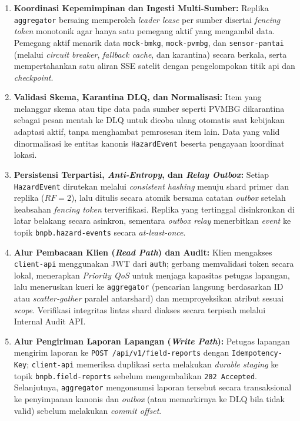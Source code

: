 \begin{enumerate}
    \item \textbf{Koordinasi Kepemimpinan dan Ingesti Multi-Sumber:} Replika \texttt{aggregator} bersaing memperoleh \textit{leader lease} per sumber disertai \textit{fencing token} monotonik agar hanya satu pemegang aktif yang mengambil data. Pemegang aktif menarik data \texttt{mock-bmkg}, \texttt{mock-pvmbg}, dan \texttt{sensor-pantai} (melalui \textit{circuit breaker}, \textit{fallback cache}, dan karantina) secara berkala, serta mempertahankan satu aliran SSE satelit dengan pengelompokan titik api dan \textit{checkpoint}.
    \item \textbf{Validasi Skema, Karantina DLQ, dan Normalisasi:} Item yang melanggar skema atau tipe data pada sumber seperti PVMBG dikarantina sebagai pesan mentah ke DLQ untuk dicoba ulang otomatis saat kebijakan adaptasi aktif, tanpa menghambat pemrosesan item lain. Data yang valid dinormalisasi ke entitas kanonis \texttt{HazardEvent} beserta pengayaan koordinat lokasi.
    \item \textbf{Persistensi Terpartisi, \textit{Anti-Entropy}, dan \textit{Relay Outbox}:} Setiap \texttt{HazardEvent} dirutekan melalui \textit{consistent hashing} menuju shard primer dan replika ($RF=2$), lalu ditulis secara atomik bersama catatan \textit{outbox} setelah keabsahan \textit{fencing token} terverifikasi. Replika yang tertinggal disinkronkan di latar belakang secara asinkron, sementara \textit{outbox relay} menerbitkan \textit{event} ke topik \texttt{bnpb.hazard-events} secara \textit{at-least-once}.
    \item \textbf{Alur Pembacaan Klien (\textit{Read Path}) dan Audit:} Klien mengakses \texttt{client-api} menggunakan JWT dari \texttt{auth}; gerbang memvalidasi token secara lokal, menerapkan \textit{Priority QoS} untuk menjaga kapasitas petugas lapangan, lalu meneruskan kueri ke \texttt{aggregator} (pencarian langsung berdasarkan ID atau \textit{scatter-gather} paralel antarshard) dan memproyeksikan atribut sesuai \textit{scope}. Verifikasi integritas lintas shard diakses secara terpisah melalui Internal Audit API.
    \item \textbf{Alur Pengiriman Laporan Lapangan (\textit{Write Path}):} Petugas lapangan mengirim laporan ke \texttt{POST /api/v1/field-reports} dengan \texttt{Idempotency-Key}; \texttt{client-api} memeriksa duplikasi serta melakukan \textit{durable staging} ke topik \texttt{bnpb.field-reports} sebelum mengembalikan \texttt{202 Accepted}. Selanjutnya, \texttt{aggregator} mengonsumsi laporan tersebut secara transaksional ke penyimpanan kanonis dan \textit{outbox} (atau memarkirnya ke DLQ bila tidak valid) sebelum melakukan \textit{commit offset}.

\end{enumerate}
